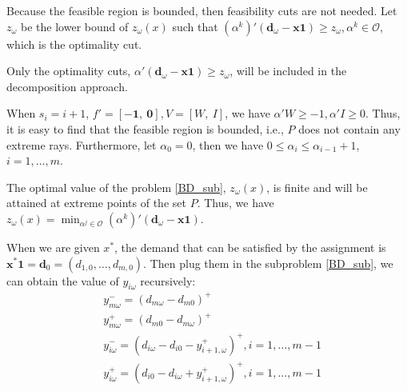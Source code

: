 Because the feasible region is bounded, then feasibility cuts are not needed. Let $z_{\omega}$ be the lower bound of $z_{\omega}(x)$ such that $(\alpha^{k}){'}(\mathbf{d}_{\omega}- \mathbf{x} \mathbf{1}) \geq z_{\omega}, \alpha^k \in \mathcal{O}$, which is the optimality cut.

\begin{corollary}
  Only the optimality cuts, $\alpha{'}(\mathbf{d}_{\omega}- \mathbf{x} \mathbf{1}) \geq z_{\omega}$, will be included in the decomposition approach.
\end{corollary}


\begin{corollary}
  When $s_i = i+1$, $f{'} = [-\mathbf{1},~\mathbf{0}], V =[W,~I]$, we have $\alpha{'}W \geq -1, \alpha{'}I \geq 0$. Thus, it is easy to find that the feasible region is bounded, i.e., $P$ does not contain any extreme rays. Furthermore, let $\alpha_0 = 0$, then we have $0 \leq \alpha_i \leq \alpha_{i-1} +1$, $i = 1, \ldots, m$.

\end{corollary}

\begin{corollary}
The optimal value of the problem \eqref{BD_sub}, $z_{\omega}(x)$, is finite and will be attained at extreme points of the set $P$. Thus, we have $z_{\omega}(x) = \min_{\alpha^j \in \mathcal{O}} (\alpha^{k}){'}(\mathbf{d}_{\omega}- \mathbf{x} \mathbf{1})$. 
\end{corollary}


When we are given $x^{*}$, the demand that can be satisfied by the assignment is $\mathbf{x}^{*} \mathbf{1} = \mathbf{d}_0 = (d_{1,0},\ldots,d_{m,0})$.
Then plug them in the subproblem \eqref{BD_sub}, we can obtain the value of $y_{i \omega}$ recursively:
\begin{equation}\label{y_recursively}
\begin{aligned}
  & y_{m \omega}^{-}=\left(d_{m \omega}-d_{m 0}\right)^{+} \\
  & y_{m \omega}^{+}=\left(d_{m 0}-d_{m \omega}\right)^{+} \\
  & y_{i \omega}^{-}=\left(d_{i \omega}-d_{i 0} - y_{i+1, \omega}^{+} \right)^{+}, i =1,\ldots,m-1 \\
  & y_{i \omega}^{+}=\left(d_{i 0}- d_{i \omega} + y_{i+1, \omega}^{+}\right)^{+}, i =1,\ldots,m-1
\end{aligned}
\end{equation}

